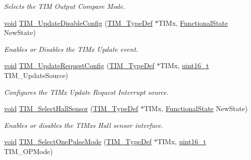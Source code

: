 \begin{DoxyCompactItemize}
\begin{DoxyCompactList}\small\item\em Selects the T\+IM Output Compare Mode. \end{DoxyCompactList}\item 
\hyperlink{usb__devapi_8h_afabf60e7f57651d6d595a02c75f07cd0}{void} \hyperlink{group___t_i_m___private___functions_gace2384dd33e849a054f61b8e1fc7e7c3}{T\+I\+M\+\_\+\+Update\+Disable\+Config} (\hyperlink{struct_t_i_m___type_def}{T\+I\+M\+\_\+\+Type\+Def} $\ast$T\+I\+Mx, \hyperlink{agilefox_2library_2inc_2stm32f10x__type_8h_ac9a7e9a35d2513ec15c3b537aaa4fba1}{Functional\+State} New\+State)
\begin{DoxyCompactList}\small\item\em Enables or Disables the T\+I\+Mx Update event. \end{DoxyCompactList}\item 
\hyperlink{usb__devapi_8h_afabf60e7f57651d6d595a02c75f07cd0}{void} \hyperlink{group___t_i_m___private___functions_ga1d7a8f952e209de142499e67a653fc1f}{T\+I\+M\+\_\+\+Update\+Request\+Config} (\hyperlink{struct_t_i_m___type_def}{T\+I\+M\+\_\+\+Type\+Def} $\ast$T\+I\+Mx, \hyperlink{_p_e___types_8h_a1f1825b69244eb3ad2c7165ddc99c956}{uint16\+\_\+t} T\+I\+M\+\_\+\+Update\+Source)
\begin{DoxyCompactList}\small\item\em Configures the T\+I\+Mx Update Request Interrupt source. \end{DoxyCompactList}\item 
\hyperlink{usb__devapi_8h_afabf60e7f57651d6d595a02c75f07cd0}{void} \hyperlink{group___t_i_m___private___functions_ga42c2d1025a3937c9d9f38631af86ffa4}{T\+I\+M\+\_\+\+Select\+Hall\+Sensor} (\hyperlink{struct_t_i_m___type_def}{T\+I\+M\+\_\+\+Type\+Def} $\ast$T\+I\+Mx, \hyperlink{agilefox_2library_2inc_2stm32f10x__type_8h_ac9a7e9a35d2513ec15c3b537aaa4fba1}{Functional\+State} New\+State)
\begin{DoxyCompactList}\small\item\em Enables or disables the T\+I\+Mx\textquotesingle{}s Hall sensor interface. \end{DoxyCompactList}\item 
\hyperlink{usb__devapi_8h_afabf60e7f57651d6d595a02c75f07cd0}{void} \hyperlink{group___t_i_m___private___functions_gadd2cca5fac6c1291dc4339098d5c9562}{T\+I\+M\+\_\+\+Select\+One\+Pulse\+Mode} (\hyperlink{struct_t_i_m___type_def}{T\+I\+M\+\_\+\+Type\+Def} $\ast$T\+I\+Mx, \hyperlink{_p_e___types_8h_a1f1825b69244eb3ad2c7165ddc99c956}{uint16\+\_\+t} T\+I\+M\+\_\+\+O\+P\+Mode)

\end{DoxyCompactItemize}
